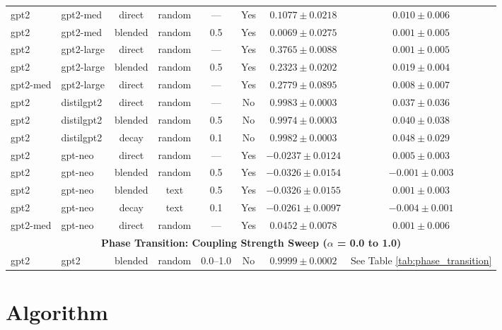 \documentclass[10pt]{article} %
\theoremstyle{plain}
\theoremstyle{definition}
\theoremstyle{remark}
\begin{document}
\begin{table}[H]
\begin{tabular}{llcccccc}
\midrule
gpt2 & gpt2-med & direct & random & --- & Yes & $0.1077 \pm 0.0218$ & $0.010 \pm 0.006$ \\
gpt2 & gpt2-med & blended & random & 0.5 & Yes & $0.0069 \pm 0.0275$ & $0.001 \pm 0.005$ \\
gpt2 & gpt2-large & direct & random & --- & Yes & $0.3765 \pm 0.0088$ & $0.001 \pm 0.005$ \\
gpt2 & gpt2-large & blended & random & 0.5 & Yes & $0.2323 \pm 0.0202$ & $0.019 \pm 0.004$ \\
gpt2-med & gpt2-large & direct & random & --- & Yes & $0.2779 \pm 0.0895$ & $0.008 \pm 0.007$ \\
\midrule
gpt2 & distilgpt2 & direct & random & --- & No & $0.9983 \pm 0.0003$ & $0.037 \pm 0.036$ \\
gpt2 & distilgpt2 & blended & random & 0.5 & No & $0.9974 \pm 0.0003$ & $0.040 \pm 0.038$ \\
gpt2 & distilgpt2 & decay & random & 0.1 & No & $0.9982 \pm 0.0003$ & $0.048 \pm 0.029$ \\
\midrule
gpt2 & gpt-neo & direct & random & --- & Yes & $-0.0237 \pm 0.0124$ & $0.005 \pm 0.003$ \\
gpt2 & gpt-neo & blended & random & 0.5 & Yes & $-0.0326 \pm 0.0154$ & $-0.001 \pm 0.003$ \\
gpt2 & gpt-neo & blended & text & 0.5 & Yes & $-0.0326 \pm 0.0155$ & $0.001 \pm 0.003$ \\
gpt2 & gpt-neo & decay & text & 0.1 & Yes & $-0.0261 \pm 0.0097$ & $-0.004 \pm 0.001$ \\
gpt2-med & gpt-neo & direct & random & --- & Yes & $0.0452 \pm 0.0078$ & $0.001 \pm 0.006$ \\
\midrule
\multicolumn{8}{c}{\textbf{Phase Transition: Coupling Strength Sweep ($\alpha$ = 0.0 to 1.0)}} \\
gpt2 & gpt2 & blended & random & 0.0--1.0 & No & $0.9999 \pm 0.0002$ & See Table \ref{tab:phase_transition} \\
\bottomrule
\end{tabular}
\end{table}

\section{Algorithm}
\end{document}
